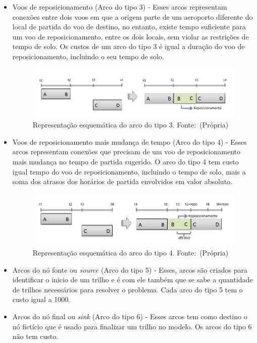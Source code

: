 \begin{itemize}
\begin{figure}[ht]
\end{figure}

\item Voos de reposicionamento (Arco do tipo 3) - Esses arcos representam
conexões entre dois voos em que a origem parte de um aeroporto diferente do
local de partida do voo de destino, no entanto, existe tempo suficiente para um
voo de reposicionamento, entre os dois locais, sem violar as restrições de
tempo de solo. Os custos de um arco do tipo 3 é igual a duração do voo de
reposicionamento, incluindo o seu tempo de solo.

\begin{figure}[ht]
	\caption{Representação esquemática do arco do tipo 3. \mbox{Fonte: (Própria)}}
	\label{fig:arc3}
	\includegraphics[scale=0.35]{./img/arc3}
	
\end{figure}

\item Voos de reposicionamento mais mudança de tempo (Arco do tipo 4) - Esses
arcos representam conexões que precisam de um voo de reposicionamento mais
mudança no tempo de partida sugerido. O arco do tipo 4 tem custo igual tempo do
voo de reposicionamento, incluindo o tempo de solo, mais a soma dos atrasos dos
horários de partida envolvidos em valor absoluto.

\begin{figure}[ht]
	\caption{Representação esquemática do arco do tipo 4. \mbox{Fonte: (Própria)}}
	\label{fig:arc4}
	\includegraphics[scale=0.35]{./img/arc4}
	
\end{figure}

\item Arcos do nó fonte ou \textit{source} (Arco do tipo 5) - Esses, arcos são
criados para identificar o inicio de um trilho e é com ele também que se sabe a
quantidade de trilhos necessários para resolver o problema. Cada arco do tipo 5
tem o custo igual a 1000.

\item Arcos do nó final ou \textit{sink} (Arco do tipo 6) - Esses arcos tem
como destino o nó fictício que é usado para finalizar um trilho no modelo. Os
arcos do tipo 6 não tem custo.

\end{itemize}

